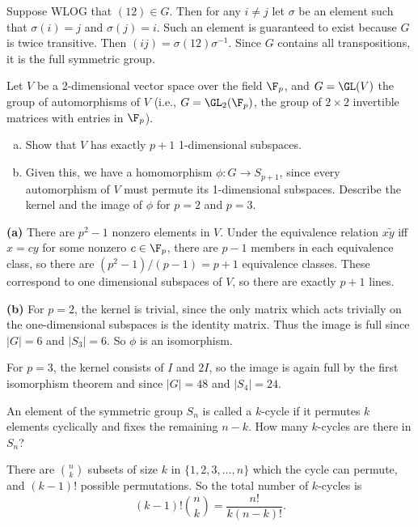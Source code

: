 \documentclass[11pt,letterpaper]{article}
\begin{document}
Suppose WLOG that $(12)\in G$. Then for any $i\neq j$ let $\sigma$ be an element such that $\sigma(i)=j$ and $\sigma(j)=i$. Such an element is guaranteed to exist because $G$ is twice transitive. Then $(ij)=\sigma(12)\sigma^{-1}$. Since $G$ contains all transpositions, it is the full symmetric group.   

\pagebreak
\begin{problem}
Let $V$ be a 2-dimensional vector space over the field $\F_p$, and $G = \GL(V)$ the group of automorphisms of $V$ (i.e., $G = \GL_2(\F_p)$, the group of $2 \times 2$ invertible matrices with entries in $\F_p$).

\begin{enumerate}[(a)]
  \item Show that $V$ has exactly $p+1$ 1-dimensional subspaces.
  \item Given this, we have a homomorphism $\phi:G\to S_{p+1}$, since every automorphism of $V$ must permute its 1-dimensional subspaces. Describe the kernel and the image of $\phi$ for $p=2$ and $p=3$.
\end{enumerate}
\end{problem}

\textbf{(a)} There are $p^2-1$ nonzero elements in $V$. Under the equivalence relation $x\tilde y$ iff $x=cy$ for some nonzero $c\in \F_p$, there are $p-1$ members in each equivalence class, so there are $(p^2-1)/(p-1)=p+1$ equivalence classes. These correspond to one dimensional subspaces of $V$, so there are exactly $p+1$ lines.     

\textbf{(b)} For $p=2$, the kernel is trivial, since the only matrix which acts trivially on the one-dimensional subspaces is the identity matrix. Thus the image is full since $|G|=6$ and $|S_{3}|=6$. So $\phi$ is an isomorphism. 

For $p=3$, the kernel consists of $I$ and $2I$, so the image is again full by the first isomorphism theorem and since $|G|=48$ and $|S_4|=24$.

\pagebreak
\begin{problem}
An element of the symmetric group $S_n$ is called a $k$-cycle if it permutes $k$ elements cyclically and fixes the remaining $n-k$. How many $k$-cycles are there in $S_n$?
\end{problem}

There are $\binom{n}{k}$ subsets of size $k$ in $\{1,2,3,\ldots,n\}$ which the cycle can permute, and $(k-1)!$ possible permutations. So the total number of $k$-cycles is
\[
  (k-1)!\binom{n}{k}=\frac{n!}{k(n-k)!}
.\] 
\end{document}
